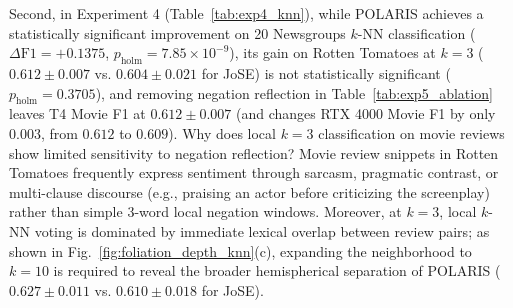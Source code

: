 \documentclass[journal]{IEEEtran}
\begin{document}
Second, in Experiment 4 (Table~\ref{tab:exp4_knn}), while POLARIS achieves a statistically significant improvement on 20 Newsgroups $k$-NN classification ($\Delta\text{F1} = +0.1375$, $p_{\text{holm}} = 7.85 \times 10^{-9}$), its gain on Rotten Tomatoes at $k=3$ ($0.612 \pm 0.007$ vs. $0.604 \pm 0.021$ for JoSE) is not statistically significant ($p_{\text{holm}} = 0.3705$), and removing negation reflection in Table~\ref{tab:exp5_ablation} leaves T4 Movie F1 at $0.612 \pm 0.007$ (and changes RTX 4000 Movie F1 by only $0.003$, from $0.612$ to $0.609$). Why does local $k=3$ classification on movie reviews show limited sensitivity to negation reflection? Movie review snippets in Rotten Tomatoes frequently express sentiment through sarcasm, pragmatic contrast, or multi-clause discourse (e.g., praising an actor before criticizing the screenplay) rather than simple 3-word local negation windows. Moreover, at $k=3$, local $k$-NN voting is dominated by immediate lexical overlap between review pairs; as shown in Fig.~\ref{fig:foliation_depth_knn}(c), expanding the neighborhood to $k=10$ is required to reveal the broader hemispherical separation of POLARIS ($0.627 \pm 0.011$ vs. $0.610 \pm 0.018$ for JoSE).

\end{document}

